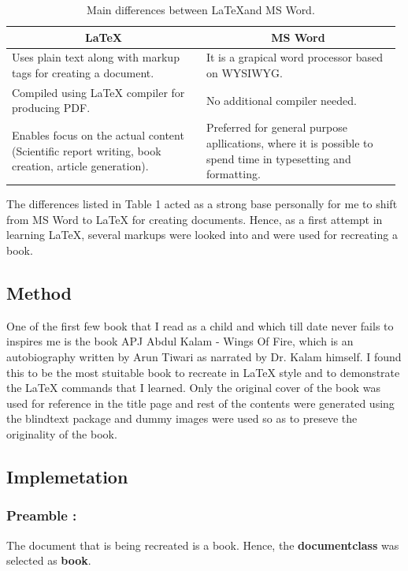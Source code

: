 \documentclass[runningheads]{llncs}
\begin{document}
\begin{table}
\caption{Main differences between \LaTeX and MS Word.} 
\begin{tabular}{p{0.49\linewidth}|p{0.49\linewidth}}
\multicolumn{1}{c|}{\LaTeX} & \multicolumn{1}{c}{MS Word} \\
\hline
Uses plain text along with markup tags for creating a document. & It is a grapical word processor based on WYSIWYG.\\
Compiled using  {\LaTeX} compiler for producing PDF. & No additional compiler needed. \\
Enables focus on the actual content (Scientific report writing, book creation, article generation). & Preferred for general purpose apllications, where it is possible to spend time in typesetting and formatting. \\
\end{tabular}
\end{table}

The differences listed in Table 1 acted as a strong base personally for me to shift from MS Word to {\LaTeX} for creating documents. Hence, as a first attempt in learning {\LaTeX}, several markups were looked into and were used for recreating a book.


\subsection{Method}
One of the first few book that I read as a child and which till date never fails to inspires me is the book APJ Abdul Kalam - Wings Of Fire, which is an autobiography written by Arun Tiwari as narrated by Dr. Kalam himself. I found this to be the most stuitable book to recreate in {\LaTeX} style and to demonstrate the {\LaTeX} commands that I learned. Only the original cover of the book was used for reference in the title page and rest of the contents were generated using the blindtext package and dummy images were used so as to preseve the originality of the book.


\subsection{Implemetation}
\subsubsection{Preamble : }
The document that is being recreated is a book. Hence, the \textbf{documentclass} was selected as \textbf{book}.
 
\end{document}
